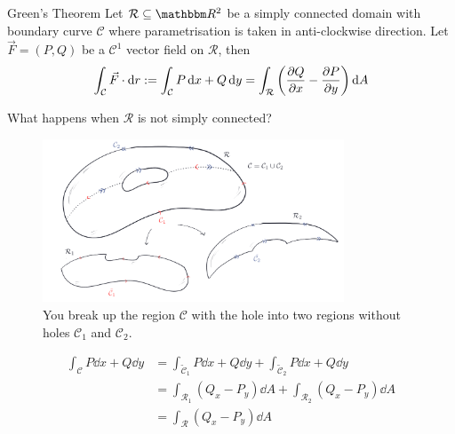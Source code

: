 \documentclass[../Analysis-3]{subfiles}
\begin{document}
\begin{Thm}{Green's Theorem}{}\label{thm2:27}
    Let $\mathcal{R} \subseteq \R^2 $ be a simply connected domain with boundary curve $\mathcal{C}$ where parametrisation is taken in anti-clockwise direction. Let $\vec{F} = (P,Q)$ be a $\mathscr{C}^1$ vector field on $\mathcal{R}$, then
    \[
        \int_{\mathcal{C}} \vec{F} \cdot \dd r := \int_{\mathcal{C}} P \, \dd x + Q \, \dd y = \int_{\mathcal{R}} \left( \pdv{Q}{x} - \pdv{P}{y}\right) \dd A
    \]
\end{Thm}

What happens when $\mathcal{R}$ is not simply connected?
\begin{figure}[H]
    \centering
    \includegraphics[width=0.8\textwidth]{../figures/lec27.5.png}
    \caption{You break up the region $\mathcal{C}$ with the hole into two regions without holes $\mathcal{C}_1$ and $\mathcal{C}_2$.}
    \label{fig5:27}
\end{figure}
\begin{align*}
    \int_{\mathcal{C}} P \dd x + Q \dd y & = \int_{\tilde{\mathcal{C}}_1} P \dd x + Q \dd y + \int_{\tilde{\mathcal{C}}_2} P \dd x + Q \dd y \\
                                         & = \int_{\mathcal{R}_1} (Q_x - P_y) \dd A + \int_{\mathcal{R}_2} (Q_x - P_y) \dd A                 \\
                                         & = \int_{\mathcal{R}} (Q_x - P_y) \dd A
\end{align*}
\end{document}
